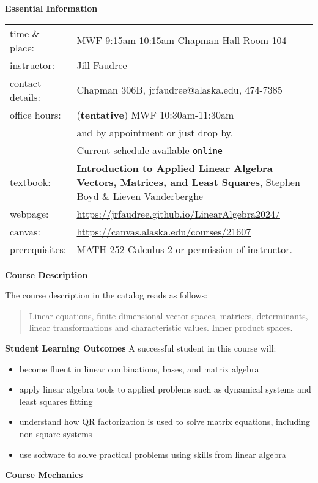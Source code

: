 \documentclass[12pt]{article}
\begin{document}
\textbf{\large{Essential Information}}

\begin{tabular}{p{} p{}}
{time \& place}:&MWF 9:15am-10:15am Chapman Hall Room 104\\
{instructor:} &Jill Faudree\\
{contact details:} &Chapman 306B, jrfaudree@alaska.edu, 474-7385\\
{office hours:} &(\textbf{tentative})  MWF 10:30am-11:30am \\
&and by appointment or just drop by.\\
&Current schedule available \href{https://docs.google.com/spreadsheets/d/1o710N0-GCNc8ICkVuf-IIC80N04p9w9wGnPADjhTMv0/pubhtml}{\texttt{online}}\\
{textbook:}& \textbf{Introduction to Applied Linear Algebra -- Vectors, Matrices, and Least Squares}, Stephen Boyd \& Lieven Vanderberghe\\
{webpage:}& \url{https://jrfaudree.github.io/LinearAlgebra2024/}\\
canvas:&\url{https://canvas.alaska.edu/courses/21607}\\
{prerequisites:} & MATH 252 Calculus 2 or permission of instructor.
\end{tabular}



\textbf{\large{Course Description}}

The course description in the catalog reads as follows:
\begin{quote} Linear equations, finite dimensional vector spaces, matrices, determinants, linear transformations and characteristic values. Inner product spaces. \end{quote}


\textbf{\large{Student Learning Outcomes}} A successful student in this course will:
\begin{itemize}
\item become fluent in linear combinations, bases, and matrix algebra
\item apply linear algebra tools to applied problems such as dynamical systems and least squares fitting
\item understand how QR factorization is used to solve matrix equations, including non-square systems
\item use software to solve practical problems using skills from linear algebra
\end{itemize}

{\textbf{\large{Course Mechanics}}}
\end{document}

